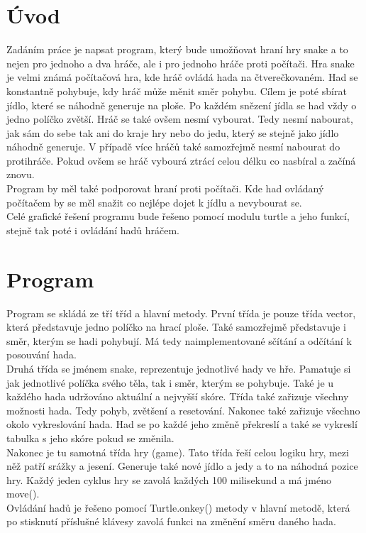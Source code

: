 \documentclass[a4paper,12pt]{report}
\begin{document}
\chapter{Úvod}
Zadáním práce je napsat program, který bude umožňovat hraní hry snake a to nejen pro jednoho a dva hráče, ale i pro jednoho hráče proti počítači. Hra snake je velmi známá počítačová hra, kde hráč ovládá hada na čtverečkovaném. Had se konstantně pohybuje, kdy hráč může měnit směr pohybu. Cílem je poté sbírat jídlo, které se náhodně generuje na ploše. Po každém snězení jídla se had vždy o jedno políčko zvětší. Hráč se také ovšem nesmí vybourat. Tedy nesmí nabourat, jak sám do sebe tak ani do kraje hry nebo do jedu, který se stejně jako jídlo náhodně generuje. V případě více hráčů také samozřejmě nesmí nabourat do protihráče. Pokud ovšem se hráč vybourá ztrácí celou délku co nasbíral a začíná znovu.\\
Program by měl také podporovat hraní proti počítači. Kde had ovládaný počítačem by se měl snažit co nejlépe dojet k jídlu a nevybourat se.\\
Celé grafické řešení programu bude řešeno pomocí modulu turtle a jeho funkcí, stejně tak poté i ovládání hadů hráčem.
\chapter{Program}
Program se skládá ze tří tříd a hlavní metody. První třída je pouze třída vector, která představuje jedno políčko na hrací ploše. Také samozřejmě představuje i směr, kterým se hadi pohybují. Má tedy naimplementované sčítání a odčítání k posouvání hada.\\
Druhá třída se jménem snake, reprezentuje jednotlivé hady ve hře. Pamatuje si jak jednotlivé políčka svého těla, tak i směr, kterým se pohybuje. Také je u každého hada udržováno aktuální a nejvyšší skóre. Třída také zařizuje všechny možnosti hada. Tedy pohyb, zvětšení a resetování. Nakonec také zařizuje všechno okolo vykreslování hada. Had se po každé jeho změně překreslí a také se vykreslí tabulka s jeho skóre pokud se změnila.\\
Nakonec je tu samotná třída hry (game). Tato třída řeší celou logiku hry, mezi něž patří srážky a jesení. Generuje také nové jídlo a jedy a to na náhodná pozice hry. Každý jeden cyklus hry se zavolá každých 100 milisekund a má jméno move().\\
Ovládání hadů je řešeno pomocí Turtle.onkey() metody v hlavní metodě, která po stisknutí příslušné klávesy zavolá funkci na změnění směru daného hada. 
\end{document}
